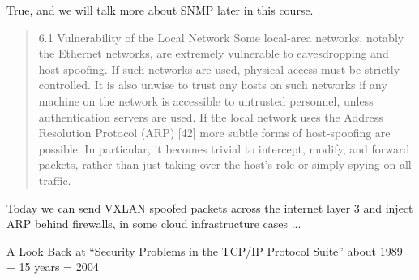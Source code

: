 \documentclass[Screen16to9,17pt]{foils}
\begin{document}
True, and we will talk more about SNMP later in this course.


\begin{quote}
6.1 Vulnerability of the Local Network
Some local-area networks, notably the Ethernet networks, are extremely vulnerable to eavesdropping and
host-spoofing. If such networks are used, physical access must be strictly controlled. It is also unwise
to trust any hosts on such networks if any machine on the network is accessible to untrusted personnel,
unless authentication servers are used.
If the local network uses the Address Resolution Protocol (ARP) [42] more subtle forms of host-spoofing
are possible. In particular, it becomes trivial to intercept, modify, and forward packets, rather than just
taking over the host’s role or simply spying on all traffic.
\end{quote}

Today we can send VXLAN spoofed packets across the internet layer 3 and inject ARP behind firewalls, in some cloud infrastructure cases ...

A Look Back at “Security Problems in the TCP/IP Protocol Suite”
about 1989 + 15 years = 2004

\slidenext
\end{document}
